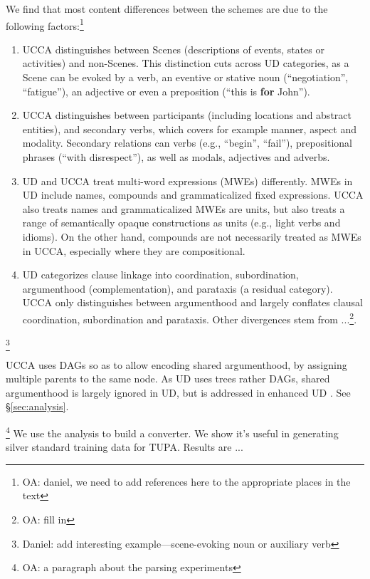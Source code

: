 \documentclass[11pt,a4paper]{article}
\newcommand{\oa}[1]{\footnote{\color{red}OA: #1}}
\newcommand{\daniel}[1]{\footnote{\color{blue}Daniel: #1}}
\begin{document}
   We find that most content differences between the schemes are due to the following factors:\oa{daniel, we need
   to add references here to the appropriate places in the text}

  \setlength{\leftmargini}{15pt}

  \begin{enumerate}[noitemsep]
    \item 
      UCCA distinguishes between Scenes (descriptions of events, states or activities) and non-Scenes. 
      This distinction cuts across UD categories, as a Scene can be evoked by a verb, an eventive or stative
      noun (``negotiation'', ``fatigue''), an adjective or even a preposition (``this  is {\bf for} John'').
    \item
      UCCA distinguishes between participants (including locations and abstract entities), and secondary verbs, 
      which covers for example manner, aspect and modality. Secondary relations can verbs (e.g., ``begin'', ``fail''),
      prepositional phrases (``with disrespect''), as well as modals, adjectives and adverbs. 
    \item
      UD and UCCA treat multi-word expressions (MWEs) differently. MWEs in UD include names, compounds and grammaticalized fixed 
      expressions. UCCA also treats names and grammaticalized MWEs are units, but also treats 
      a range of semantically opaque constructions as units (e.g., light verbs and idioms).
      On the other hand, compounds are not necessarily treated as MWEs in UCCA, especially where they are compositional.      
      \item
      UD categorizes clause linkage into coordination, subordination, argumenthood (complementation),
      and parataxis (a residual category). UCCA only distinguishes between argumenthood 
      and largely conflates clausal coordination, subordination and parataxis. 
      Other divergences stem from ...\oa{fill in}. 
     \end{enumerate}\daniel{add interesting example---scene-evoking noun or auxiliary verb}

   UCCA uses DAGs so as to allow encoding shared argumenthood, by assigning multiple parents to the same node. 
   As UD uses trees rather DAGs, shared argumenthood is largely ignored in UD, but is addressed in enhanced UD \cite{}.
  See \S\ref{sec:analysis}.

  \oa{a paragraph about the parsing experiments}
  We use the analysis to build a converter. We show it's useful in generating silver standard training data for TUPA.
  Results are ...
  
\end{document}
